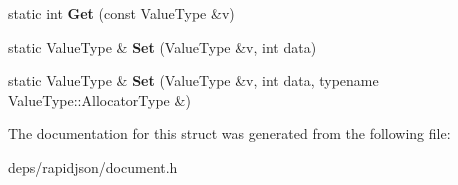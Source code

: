 \begin{DoxyCompactItemize}
\item 
static int {\bfseries Get} (const Value\+Type \&v)\hypertarget{structinternal_1_1_type_helper_3_01_value_type_00_01int_01_4_a98c331ac026873b9ad4ba68e7bf28446}{}\label{structinternal_1_1_type_helper_3_01_value_type_00_01int_01_4_a98c331ac026873b9ad4ba68e7bf28446}

\item 
static Value\+Type \& {\bfseries Set} (Value\+Type \&v, int data)\hypertarget{structinternal_1_1_type_helper_3_01_value_type_00_01int_01_4_aceea0a0fac6684e53a9d9f66da4154cd}{}\label{structinternal_1_1_type_helper_3_01_value_type_00_01int_01_4_aceea0a0fac6684e53a9d9f66da4154cd}

\item 
static Value\+Type \& {\bfseries Set} (Value\+Type \&v, int data, typename Value\+Type\+::\+Allocator\+Type \&)\hypertarget{structinternal_1_1_type_helper_3_01_value_type_00_01int_01_4_a2ca21bedcaeaf0fffe913edb2fe1a66a}{}\label{structinternal_1_1_type_helper_3_01_value_type_00_01int_01_4_a2ca21bedcaeaf0fffe913edb2fe1a66a}

\end{DoxyCompactItemize}


The documentation for this struct was generated from the following file\+:\begin{DoxyCompactItemize}
\item 
deps/rapidjson/document.\+h\end{DoxyCompactItemize}
